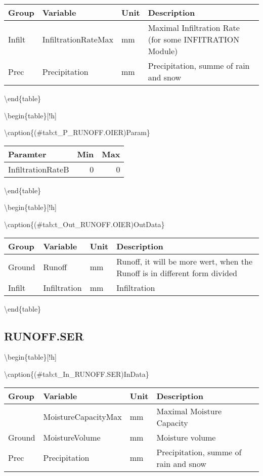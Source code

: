 \documentclass[
]{book}
\begin{document}
\begin{tabular}[t]{l|l|l|l}
\hline
Group & Variable & Unit & Description\\
\hline
Infilt & InfiltrationRateMax & mm & Maximal Infiltration Rate (for some INFITRATION Module)\\
\cline{1-4}
Prec & Precipitation & mm & Precipitation, summe of rain and snow\\
\hline
\end{tabular}

\textbackslash end\{table\}

\textbackslash begin\{table\}{[}!h{]}

\textbackslash caption\{(\#tab:t\_P\_RUNOFF.OIER)Param\}
\centering

\begin{tabular}[t]{l|r|r}
\hline
Paramter & Min & Max\\
\hline
InfiltrationRateB & 0 & 0\\
\hline
\end{tabular}

\textbackslash end\{table\}

\textbackslash begin\{table\}{[}!h{]}

\textbackslash caption\{(\#tab:t\_Out\_RUNOFF.OIER)OutData\}
\centering

\begin{tabular}[t]{l|l|l|l}
\hline
Group & Variable & Unit & Description\\
\hline
Ground & Runoff & mm & Runoff, it will be more wert, when the Runoff is in different form divided\\
\cline{1-4}
Infilt & Infiltration & mm & Infiltration\\
\hline
\end{tabular}

\textbackslash end\{table\}

\hypertarget{runoff.ser}{%
\subsection{RUNOFF.SER}\label{runoff.ser}}

\textbackslash begin\{table\}{[}!h{]}

\textbackslash caption\{(\#tab:t\_In\_RUNOFF.SER)InData\}
\centering

\begin{tabular}[t]{l|l|l|l}
\hline
Group & Variable & Unit & Description\\
\hline
 & MoistureCapacityMax & mm & Maximal Moisture Capacity\\
\cline{2-4}
\multirow{-2}{*}{\raggedright\arraybackslash Ground} & MoistureVolume & mm & Moisture volume\\
\cline{1-4}
Prec & Precipitation & mm & Precipitation, summe of rain and snow\\
\hline
\end{tabular}
\end{document}
